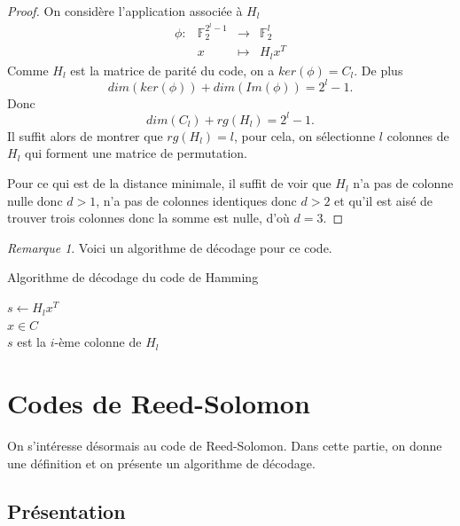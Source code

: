 \documentclass{article}
\theoremstyle{definition}
\theoremstyle{remark}
\newtheorem{remark}{Remarque}
\begin{document}
\begin{proof}
    On considère l'application associée à $H_l$
    \[ 
    \begin{array}{cccc}
         \phi: & \mathbb{F}_2^{2^l - 1} & \longrightarrow & \mathbb{F}_2^l\\
         & x & \longmapsto & H_lx^T
    \end{array}
    \]
    Comme $H_l$ est la matrice de parité du code, on a $ker(\phi) = C_l$. De plus
    \[dim(ker(\phi)) + dim(Im(\phi)) = 2^l - 1.\]
    Donc
    \[dim(C_l) + rg(H_l) = 2^l - 1.\]
    Il suffit alors de montrer que $rg(H_l) = l$, pour cela, on sélectionne $l$ colonnes de $H_l$ qui forment une matrice de permutation.

    Pour ce qui est de la distance minimale, il suffit de voir que $H_l$ n'a pas de colonne nulle donc $d > 1$, n'a pas de colonnes identiques donc $d > 2$ et qu'il est aisé de trouver trois colonnes donc la somme est nulle, d'où $d = 3$.
\end{proof}

\begin{remark}
    Voici un algorithme de décodage pour ce code.
    \begin{algorithm}
    \caption{Algorithme de décodage du code de Hamming}
        $s \gets H_lx^T$ \\
        {
            $x \in C$ \\
        }
        {
            $s$ est la $i$-ème colonne de $H_l$ \\
        }
        
    \end{algorithm}
\end{remark}

\section{Codes de Reed-Solomon}
\label{sec:rs}

On s'intéresse désormais au code de Reed-Solomon. Dans cette partie, on donne une définition et on présente un algorithme de décodage.

\subsection{Présentation}
\label{sec:rs-pre}
\end{document}
